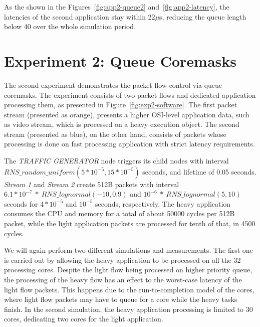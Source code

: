 As the shown in the Figures~\ref{fig:app2-queue2} and~\ref{fig:app2-latency}, the latencies of the second application stay within 22$\mu$s, reducing the queue length below 40 over the whole simulation period.

\section{Experiment 2: Queue Coremasks}

The second experiment demonstrates the packet flow control via queue coremasks. The experiment consists of two packet flows and dedicated application processing them, as presented in Figure~\ref{fig:exp2-software}. The first packet stream (presented as orange), presents a higher OSI-level application data, such as video stream, which is processed on a heavy execution object. The second stream (presented as blue), on the other hand, consists of packets whose processing is done on fast processing application with strict latency requirements.

The \emph{TRAFFIC GENERATOR} node triggers its child nodes with interval $RNS\_random\_uniform(5*10^{-5}, 15*10^{-5})$ seconds, and lifetime of 0.05 seconds. \emph{Stream 1} and \emph{Stream 2} create 512B packets with interval $6.1*10^{-7}~*~RNS\_lognormal(-10, 0.9)$ and $10^{-6}~*~RNS\_lognormal(5, 10)$ seconds for $4*10^{-5}$ and $10^{-5}$ seconds, respectively. The heavy application consumes the CPU and memory for a total of about 50000 cycles per 512B packet, while the light application packets are processed for tenth of that, in 4500 cycles.

We will again perform two different simulations and measurements. The first one is carried out by allowing the heavy application to be processed on all the 32 processing cores. Despite the light flow being processed on higher priority queue, the processing of the heavy flow has an effect to the worst-case latency of the light flow packets. This happens due to the run-to-completion model of the cores, where light flow packets may have to queue for a core while the heavy tasks finish. In the second simulation, the heavy application processing is limited to 30 cores, dedicating two cores for the light application.

